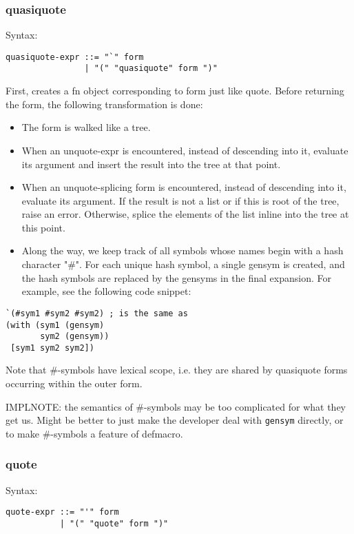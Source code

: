 \documentclass[11pt]{article}
\begin{document}
\subsubsection{quasiquote}
\label{sec:orgf21b880}
Syntax:
\begin{verbatim}
quasiquote-expr ::= "`" form
                | "(" "quasiquote" form ")"
\end{verbatim}

First, creates a fn object corresponding to form just like quote. Before
returning the form, the following transformation is done:
\begin{itemize}
\item The form is walked like a tree.
\item When an unquote-expr is encountered, instead of descending into it, evaluate
its argument and insert the result into the tree at that point.
\item When an unquote-splicing form is encountered, instead of descending into it,
evaluate its argument. If the result is not a list or if this is root of the
tree, raise an error. Otherwise, splice the elements of the list inline into
the tree at this point.
\item Along the way, we keep track of all symbols whose names begin with a hash
character "\#". For each unique hash symbol, a single gensym is created, and
the hash symbols are replaced by the gensyms in the final expansion. For
example, see the following code snippet:
\end{itemize}
\begin{verbatim}
`(#sym1 #sym2 #sym2) ; is the same as
(with (sym1 (gensym)
       sym2 (gensym))
 [sym1 sym2 sym2])
\end{verbatim}
Note that \#-symbols have lexical scope, i.e. they are shared by quasiquote forms
occurring within the outer form.

IMPLNOTE: the semantics of \#-symbols may be too complicated for what they get
us. Might be better to just make the developer deal with \texttt{gensym} directly, or to
make \#-symbols a feature of defmacro.

\subsubsection{quote}
\label{sec:orgcd4124b}
Syntax:
\begin{verbatim}
quote-expr ::= "'" form
           | "(" "quote" form ")"
\end{verbatim}
\end{document}
